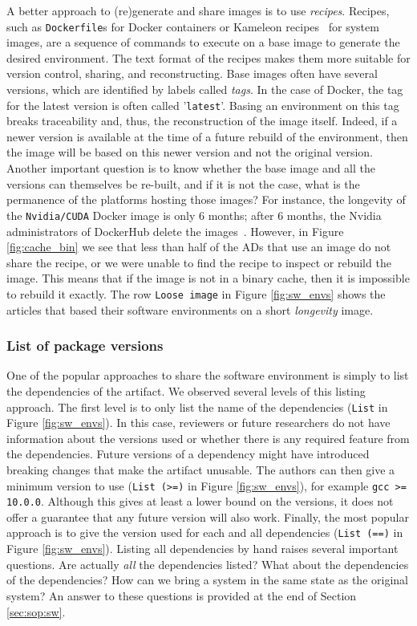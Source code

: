 \documentclass[sigconf,natbib=false]{acmart}
\newcommand{\ad}{AD}
\begin{document}
A better approach to (re)generate and share images is to use \emph{recipes}.
Recipes, such as \texttt{Dockerfile}s for Docker containers or Kameleon recipes~\cite{ruiz_reconstructable_2015} for system images, are a sequence of commands to execute on a base image to generate the desired environment.
The text format of the recipes makes them more suitable for version control, sharing, and reconstructing.
Base images often have several versions, which are identified by labels called \emph{tags}.
In the case of Docker, the tag for the latest version is often called '\texttt{latest}'.
Basing an environment on this tag breaks traceability and, thus, the reconstruction of the image itself.
Indeed, if a newer version is available at the time of a future rebuild of the environment, then the image will be based on this newer version and not the original version.
Another important question is to know whether the base image and all the versions can themselves be re-built, and if it is not the case, what is the permanence of the platforms hosting those images?
For instance, the longevity of the \texttt{Nvidia/CUDA} Docker image is only 6 months; after 6 months, the Nvidia administrators of DockerHub delete the images\ \cite{nvidia_cuda_lifetime}.
However, in Figure \ref{fig:cache_bin} we see that less than half of the \ad s that use an image do not share the recipe, or we were unable to find the recipe to inspect or rebuild the image.
This means that if the image is not in a binary cache, then it is impossible to rebuild it exactly.
The row \texttt{Loose image} in Figure \ref{fig:sw_envs} shows the articles that based their software environments on a short \emph{longevity} image.


\subsubsection{List of package versions}\label{sec:sop:sw:list}

One of the popular approaches to share the software environment is simply to list the dependencies of the artifact.
We observed several levels of this listing approach.
The first level is to only list the name of the dependencies (\texttt{List} in Figure \ref{fig:sw_envs}).
In this case, reviewers or future researchers do not have information about the versions used or whether there is any required feature from the dependencies.
Future versions of a dependency might have introduced breaking changes that make the artifact unusable.
The authors can then give a minimum version to use (\texttt{List (>=)} in Figure \ref{fig:sw_envs}), for example \texttt{gcc >= 10.0.0}.
Although this gives at least a lower bound on the versions, it does not offer a guarantee that any future version will also work.
Finally, the most popular approach is to give the version used for each and all dependencies (\texttt{List (==)} in Figure \ref{fig:sw_envs}).
Listing all dependencies by hand raises several important questions.
Are actually \emph{all} the dependencies listed?
What about the dependencies of the dependencies?
How can we bring a system in the same state as the original system?
An answer to these questions is provided at the end of Section \ref{sec:sop:sw}.
\end{document}
